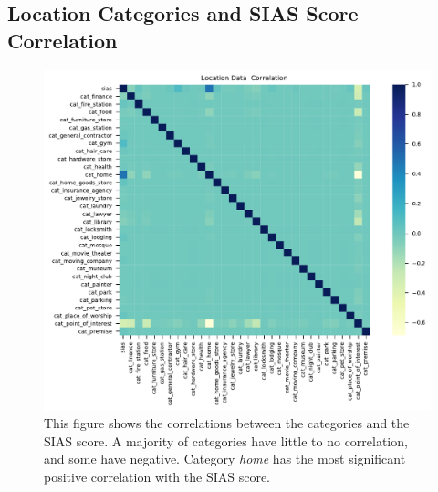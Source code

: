 \documentclass{l4proj}
\begin{document}
\begin{appendices}
\chapter{Location Categories and SIAS Score Correlation}
\begin{figure}[htb]
    \centering
    \includegraphics[width=1.1\linewidth]{images/location/correlation_LocationData.pdf}
    \caption{This figure shows the correlations between the categories and the SIAS score. A majority of categories have little to no correlation, and some have negative. Category \textit{home} has the most significant positive correlation with the SIAS score.}
    \label{fig:location_category_correlations} 
\end{figure}


\end{appendices}
\end{document}

